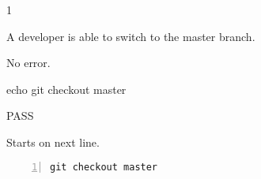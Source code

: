 \begin{description}[align=right,leftmargin=3.2cm,labelindent=3.0cm]
\item[Step:] 1
\item[Confirm:] A developer is able to switch to the master branch.
\item[Expectation:] No error.
\item[Command:] echo git  checkout master
\item[Test Result:] PASS
\item[Evidence:] Starts on next line.
\end{description}
\begin{lstlisting}[numbers=left]
git checkout master

\end{lstlisting}

